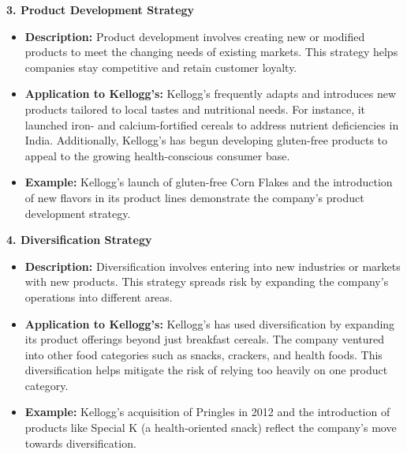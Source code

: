 \documentclass[10pt,a4paper]{book}
\begin{document}
\vspace{0.5cm}

\textbf{3. Product Development Strategy}
\begin{itemize}
    \item \textbf{Description:} Product development involves creating new or modified products to meet the changing needs of existing markets. This strategy helps companies stay competitive and retain customer loyalty.
    \item \textbf{Application to Kellogg's:} Kellogg's frequently adapts and introduces new products tailored to local tastes and nutritional needs. For instance, it launched iron- and calcium-fortified cereals to address nutrient deficiencies in India. Additionally, Kellogg’s has begun developing gluten-free products to appeal to the growing health-conscious consumer base.
    \item \textbf{Example:} Kellogg's launch of gluten-free Corn Flakes and the introduction of new flavors in its product lines demonstrate the company’s product development strategy.
\end{itemize}

\vspace{0.5cm}

\textbf{4. Diversification Strategy}
\begin{itemize}
    \item \textbf{Description:} Diversification involves entering into new industries or markets with new products. This strategy spreads risk by expanding the company's operations into different areas.
    \item \textbf{Application to Kellogg's:} Kellogg's has used diversification by expanding its product offerings beyond just breakfast cereals. The company ventured into other food categories such as snacks, crackers, and health foods. This diversification helps mitigate the risk of relying too heavily on one product category.
    \item \textbf{Example:} Kellogg's acquisition of Pringles in 2012 and the introduction of products like Special K (a health-oriented snack) reflect the company's move towards diversification.
\end{itemize}

\vspace{0.5cm}
\end{document}

